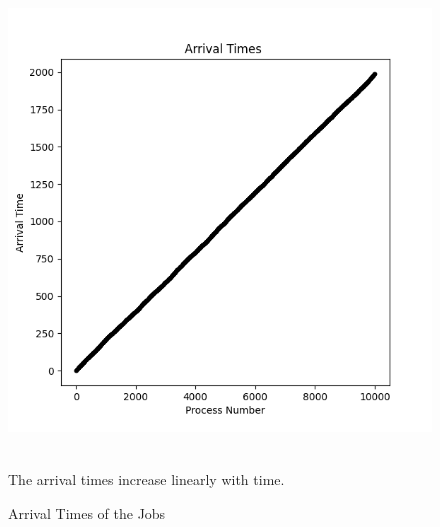 \documentclass[10pt]{article}
\begin{document}
\begin{figure}
    \centering
    \includegraphics{images/arrival_times.png}
    \caption{Arrival Times of the Jobs}
    \label{Arrival Times of the Jobs}
    \\
The arrival times increase linearly with time.\\
\end{figure}
\end{document}
